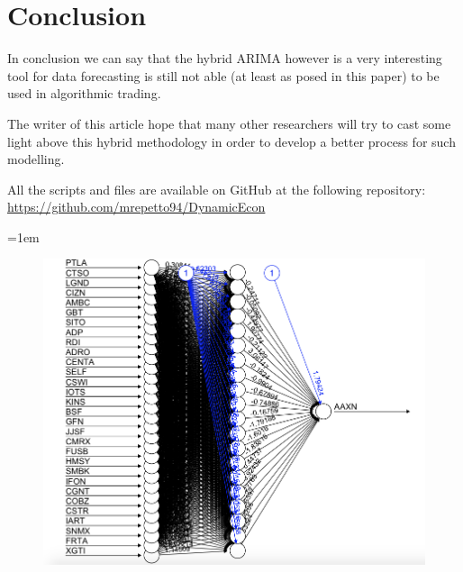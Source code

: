 \documentclass[twocolumn]{article}
\begin{document}
\section{Conclusion}
In conclusion we can say that the hybrid ARIMA however is a very interesting tool for data forecasting is still not able (at least as posed in this paper) to be used in algorithmic trading. 

The writer of this article hope that many other researchers will try to cast some light above this hybrid methodology in order to develop a better process for such modelling.

All the scripts and files are available on GitHub at the following repository:
\href{url}{https://github.com/mrepetto94/DynamicEcon} 

\newpage
\emergencystretch=1em
\sloppy
\printbibliography

\newpage
\newpage

\begin{figure}
\centering
\includegraphics[width=\linewidth, height=\textheight,keepaspectratio]{Paper/images/NN_plot.png}
\caption[short]{}
\label{NN_plot}
\end{figure}
\end{document}
